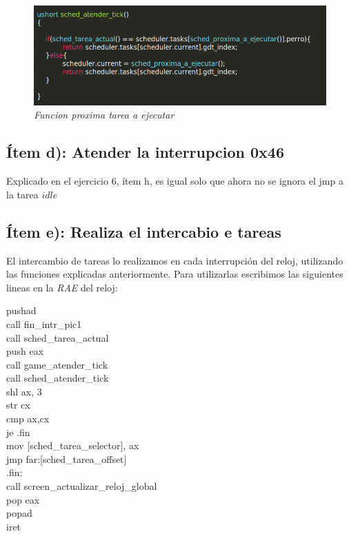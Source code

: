 \begin{figure}[H]
\begin{center}
\includegraphics[width=\linewidth]{ejercicio7/atendtick.png}
\caption{{\small \textit{Funcion proxima tarea a ejecutar }}}
\endminipage
\end{center}
\end{figure}

\subsection{Ítem d):  Atender la interrupcion 0x46}

Explicado en el ejercicio 6, ítem h, es igual solo que ahora no se ignora el jmp a la tarea $idle$

\subsection{Ítem e):  Realiza el intercabio e tareas}

El intercambio de tareas lo realizamos en cada interrupción del reloj, utilizando las funciones explicadas anteriormente. Para utilizarlas escribimos las siguientes lineas en la \textit{RAE} del reloj:

\begin{center}

    pushad \\    
    call fin\_intr\_pic1 \\
    call sched\_tarea\_actual \\
    push eax    \\
    call game\_atender\_tick \\           
    call sched\_atender\_tick \\

    shl ax, 3  \\
    str cx \\
    cmp ax,cx \\
    je .fin \\

    mov [sched\_tarea\_selector], ax \\
    jmp far:[sched\_tarea\_offset] \\

    .fin: \\
     call screen\_actualizar\_reloj\_global \\    
    pop eax \\
    popad \\
    iret \\

\end{center}

